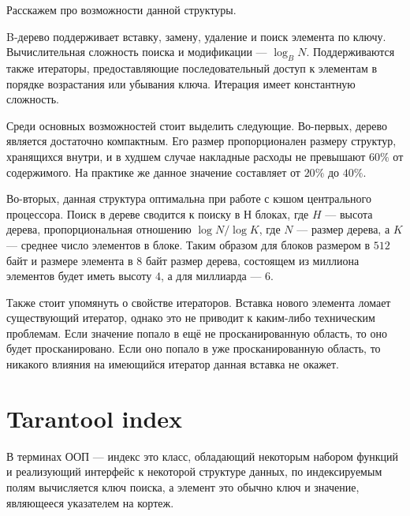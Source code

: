 Расскажем про возможности данной структуры.

B-дерево поддерживает вставку, замену, удаление и поиск
элемента по ключу.
Вычислительная сложность поиска и модификации --- $\log_{B}{N}$.
Поддерживаются также итераторы,
предоставляющие последовательный доступ к элементам в порядке возрастания или убывания ключа.
Итерация имеет константную сложность.

Среди основных возможностей стоит выделить следующие.
Во-первых, дерево является достаточно компактным.
Его размер пропорционален размеру структур, хранящихся внутри,
и в худшем случае накладные расходы не превышают $60\%$
от содержимого.
На практике же данное значение составляет от $20\%$ до $40\%$.

Во-вторых, данная структура оптимальна при работе с кэшом центрального процессора.
Поиск в дереве сводится к поиску в $Н$ блоках,
где $H$ --- высота дерева,
пропорциональная отношению $\log{N}/\log{K}$,
где $N$ --- размер дерева, а $K$ --- среднее число элементов в блоке.
Таким образом для блоков размером в $512$ байт и размере элемента в $8$ байт размер дерева,
состоящем из миллиона элементов будет иметь высоту $4$,
а для миллиарда --- $6$.

Также стоит упомянуть о свойстве итераторов.
Вставка нового элемента ломает существующий итератор,
однако это не приводит к каким-либо техническим проблемам.
Если значение попало в ещё не просканированную область,
то оно будет просканировано.
Если оно попало в уже просканированную область,
то никакого влияния на имеющийся итератор данная вставка не окажет.

\section{Tarantool index}
В терминах ООП --- индекс это класс,
обладающий некоторым набором функций и реализующий интерфейс
к некоторой структуре данных,
по индексируемым полям вычисляется ключ поиска,
а элемент это обычно ключ и значение, являющееся указателем на кортеж.


